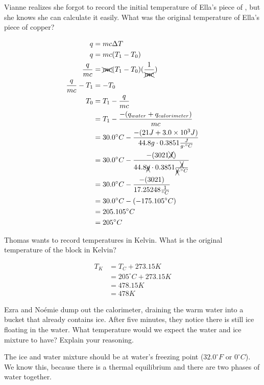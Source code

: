 \documentclass[11pt,addpoints]{exam}   	%
\begin{document}
\begin{questions}
\question[5] Vianne realizes she forgot to record the initial temperature of Ella's piece of , but she knows she can calculate it easily. What was the original temperature of Ella's piece of copper?
\begin{solution}
\begin{equation} 
\begin{split}
   q &= m c \Delta T \\
   q &= m c (T_1 - T_0) \\
   \frac{q}{m c} &= \xcancel{m c} (T_1 - T_0) ( \frac{1}{\xcancel{m c}} ) \\
   \frac{q}{m c} - T_1 &= - T_0 \\
   T_0 &= T_1 - \frac{q}{m c} \\
           &= T_1 - \frac{ - (q_{water} + q_{calorimeter}) }{m c} \\
           &= 30.0^{\circ}C - \frac{ -(21J  + 3.0 \times 10^3 J) }{44.8g \cdot  0.3851 \frac{J}{g \cdot ^{\circ} C}} \\     
           &= 30.0^{\circ}C - \frac{ -(3021 \xcancel{J}) }{44.8 \xcancel{g} \cdot  0.3851 \frac{\xcancel{J}}{\xcancel{g} \cdot ^{\circ} C}} \\     
           &= 30.0^{\circ}C - \frac{ -(3021 ) } {17.25248  \frac{1}{ ^{\circ} C}} \\ 
           &= 30.0^{\circ}C - (- 175.105 ^{\circ} C)\\
           &= 205.105 ^{\circ} C \\
           &= 205 ^{\circ} C
 \end{split}
 \end{equation}
 \end{solution}

\question[5] Thomas wants to record temperatures in Kelvin. What is the original temperature of the  block in Kelvin?
\begin{solution}
\begin{equation} 
\begin{split}
    T_K &= T_C + 273.15 K \\
            &= 205^{\circ}C + 273.15 K \\
            &= 478.15 K \\
            &= 478 K                                       
 \end{split}
 \end{equation}
 \end{solution}
 
\question[5] Ezra and No\'{e}mie dump out the calorimeter, draining the warm water into a bucket that already contains ice. After five minutes, they notice there is still ice floating in the water. What temperature would we expect the water and ice mixture to have? Explain your reasoning.
\begin{solution}
The ice and water mixture should be at water's freezing point ($32.0 ^{\circ} F$ or $0 ^{\circ} C$).
We know this, because there is a thermal equilibrium and there are two phases of water together.
\end{solution}


\end{questions}
\end{document}
